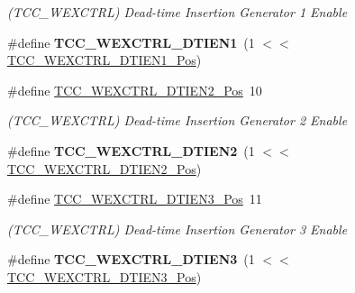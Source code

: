 \begin{DoxyCompactItemize}
\begin{DoxyCompactList}\small\item\em (T\+C\+C\+\_\+\+W\+E\+X\+C\+T\+R\+L) Dead-\/time Insertion Generator 1 Enable \end{DoxyCompactList}\item 
\hypertarget{group___s_a_m_l21___t_c_c_gae3e45b62bd2d84f25a058b825145032c}{}\#define {\bfseries T\+C\+C\+\_\+\+W\+E\+X\+C\+T\+R\+L\+\_\+\+D\+T\+I\+E\+N1}~(1 $<$$<$ \hyperlink{group___s_a_m_l21___t_c_c_ga682056b1480c2f8d0de0440e565198ba}{T\+C\+C\+\_\+\+W\+E\+X\+C\+T\+R\+L\+\_\+\+D\+T\+I\+E\+N1\+\_\+\+Pos})\label{group___s_a_m_l21___t_c_c_gae3e45b62bd2d84f25a058b825145032c}

\item 
\hypertarget{group___s_a_m_l21___t_c_c_ga2be97a72e020088a660d4a1ceb9b5166}{}\#define \hyperlink{group___s_a_m_l21___t_c_c_ga2be97a72e020088a660d4a1ceb9b5166}{T\+C\+C\+\_\+\+W\+E\+X\+C\+T\+R\+L\+\_\+\+D\+T\+I\+E\+N2\+\_\+\+Pos}~10\label{group___s_a_m_l21___t_c_c_ga2be97a72e020088a660d4a1ceb9b5166}

\begin{DoxyCompactList}\small\item\em (T\+C\+C\+\_\+\+W\+E\+X\+C\+T\+R\+L) Dead-\/time Insertion Generator 2 Enable \end{DoxyCompactList}\item 
\hypertarget{group___s_a_m_l21___t_c_c_ga346b1e174fe0a2ea14bf86acaa0f0b31}{}\#define {\bfseries T\+C\+C\+\_\+\+W\+E\+X\+C\+T\+R\+L\+\_\+\+D\+T\+I\+E\+N2}~(1 $<$$<$ \hyperlink{group___s_a_m_l21___t_c_c_ga2be97a72e020088a660d4a1ceb9b5166}{T\+C\+C\+\_\+\+W\+E\+X\+C\+T\+R\+L\+\_\+\+D\+T\+I\+E\+N2\+\_\+\+Pos})\label{group___s_a_m_l21___t_c_c_ga346b1e174fe0a2ea14bf86acaa0f0b31}

\item 
\hypertarget{group___s_a_m_l21___t_c_c_gaded1bff9ea26914e94848e60ce94a817}{}\#define \hyperlink{group___s_a_m_l21___t_c_c_gaded1bff9ea26914e94848e60ce94a817}{T\+C\+C\+\_\+\+W\+E\+X\+C\+T\+R\+L\+\_\+\+D\+T\+I\+E\+N3\+\_\+\+Pos}~11\label{group___s_a_m_l21___t_c_c_gaded1bff9ea26914e94848e60ce94a817}

\begin{DoxyCompactList}\small\item\em (T\+C\+C\+\_\+\+W\+E\+X\+C\+T\+R\+L) Dead-\/time Insertion Generator 3 Enable \end{DoxyCompactList}\item 
\hypertarget{group___s_a_m_l21___t_c_c_ga3f74c446b18d07afb7982adb35e0ef80}{}\#define {\bfseries T\+C\+C\+\_\+\+W\+E\+X\+C\+T\+R\+L\+\_\+\+D\+T\+I\+E\+N3}~(1 $<$$<$ \hyperlink{group___s_a_m_l21___t_c_c_gaded1bff9ea26914e94848e60ce94a817}{T\+C\+C\+\_\+\+W\+E\+X\+C\+T\+R\+L\+\_\+\+D\+T\+I\+E\+N3\+\_\+\+Pos})\label{group___s_a_m_l21___t_c_c_ga3f74c446b18d07afb7982adb35e0ef80}


\end{DoxyCompactItemize}
